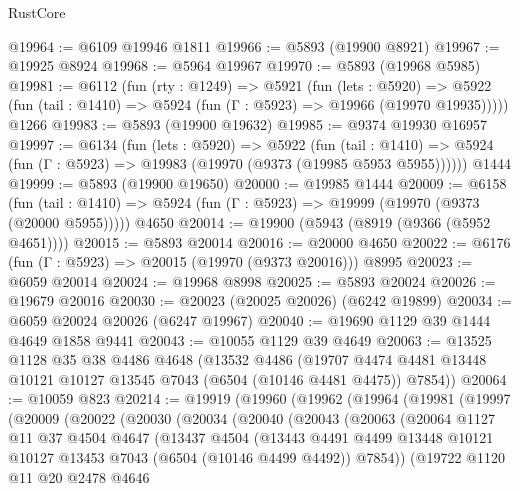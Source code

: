 \begin{lexlean}{RustCore}
\begin{coremodule}
@19964 := @6109 @19946 @1811
@19966 := @5893 (@19900 @8921)
@19967 := @19925 @8924
@19968 := @5964 @19967
@19970 := @5893 (@19968 @5985)
@19981 := @6112
    (fun (rty : @1249) =>
    @5921
      (fun (lets : @5920) =>
      @5922 (fun (tail : @1410) => @5924 (fun (Γ : @5923) => @19966 (@19970 @19935)))))
    @1266
@19983 := @5893 (@19900 @19632)
@19985 := @9374 @19930 @16957
@19997 := @6134
    (fun (lets : @5920) =>
    @5922
      (fun (tail : @1410) =>
      @5924 (fun (Γ : @5923) => @19983 (@19970 (@9373 (@19985 @5953 @5955))))))
    @1444
@19999 := @5893 (@19900 @19650)
@20000 := @19985 @1444
@20009 := @6158
    (fun (tail : @1410) => @5924 (fun (Γ : @5923) => @19999 (@19970 (@9373 (@20000 @5955)))))
    @4650
@20014 := @19900 (@5943 (@8919 (@9366 (@5952 @4651))))
@20015 := @5893 @20014
@20016 := @20000 @4650
@20022 := @6176 (fun (Γ : @5923) => @20015 (@19970 (@9373 @20016))) @8995
@20023 := @6059 @20014
@20024 := @19968 @8998
@20025 := @5893 @20024
@20026 := @19679 @20016
@20030 := @20023 (@20025 @20026) (@6242 @19899)
@20034 := @6059 @20024 @20026 (@6247 @19967)
@20040 := @19690 @1129 @39 @1444 @4649 @1858 @9441
@20043 := @10055 @1129 @39 @4649
@20063 := @13525
    @1128
    @35
    @38
    @4486
    @4648
    (@13532
      @4486
      (@19707 @4474 @4481 @13448 @10121 @10127 @13545 @7043 (@6504 (@10146 @4481 @4475)) @7854))
@20064 := @10059 @823
@20214 := @19919
    (@19960
      (@19962
        (@19964
          (@19981
            (@19997
              (@20009
                (@20022
                  (@20030
                    (@20034
                      (@20040
                        (@20043
                          (@20063
                            (@20064
                              @1127
                              @11
                              @37
                              @4504
                              @4647
                              (@13437
                                @4504
                                (@13443
                                  @4491
                                  @4499
                                  @13448
                                  @10121
                                  @10127
                                  @13453
                                  @7043
                                  (@6504 (@10146 @4499 @4492))
                                  @7854))
                              (@19722
                                @1120
                                @11
                                @20
                                @2478
                                @4646

\end{coremodule}
\end{lexlean}
